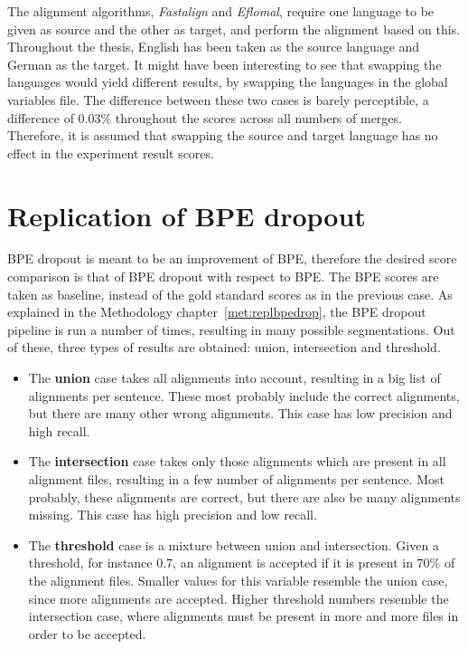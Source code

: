 The alignment algorithms, \emph{Fastalign} and \emph{Eflomal}, require one language to be given as source and the other as target, and perform the alignment based on this. Throughout the thesis, English has been taken as the source language and German as the target. It might have been interesting to see that swapping the languages would yield different results, by swapping the languages in the global variables file. The difference between these two cases is barely perceptible, a difference of 0.03\% throughout the scores across all numbers of merges. Therefore, it is assumed that swapping the source and target language has no effect in the experiment result scores.

\section{Replication of BPE dropout}

BPE dropout is meant to be an improvement of BPE, therefore the desired score comparison is that of BPE dropout with respect to BPE. The BPE scores are taken as baseline, instead of the gold standard scores as in the previous case. As explained in the Methodology chapter~\ref{met:replbpedrop}, the BPE dropout pipeline is run a number of times, resulting in many possible segmentations. Out of these, three types of results are obtained: union, intersection and threshold.

\begin{itemize}
	\item The \textbf{union} case takes all alignments into account, resulting in a big list of alignments per sentence. These most probably include the correct alignments, but there are many other wrong alignments. This case has low precision and high recall.
	\item The \textbf{intersection} case takes only those alignments which are present in all alignment files, resulting in a few number of alignments per sentence. Most probably, these alignments are correct, but there are also be many alignments missing. This case has high precision and low recall.
	\item The \textbf{threshold} case is a mixture between union and intersection. Given a threshold, for instance 0.7, an alignment is accepted if it is present in 70\% of the alignment files. Smaller values for this variable resemble the union case, since more alignments are accepted. Higher threshold numbers resemble the intersection case, where alignments must be present in more and more files in order to be accepted.
\end{itemize}

